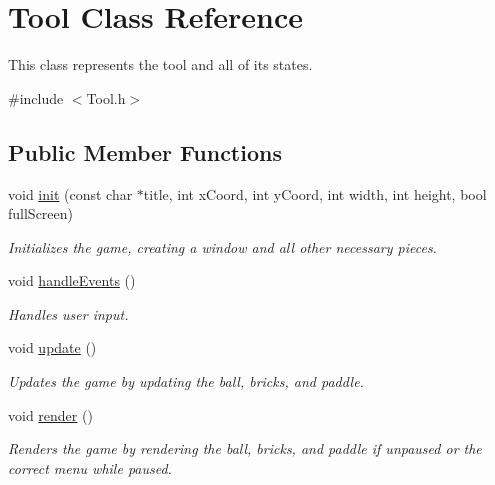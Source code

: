 \hypertarget{class_tool}{}\section{Tool Class Reference}
\label{class_tool}


This class represents the tool and all of its states.  




{\ttfamily \#include $<$Tool.\+h$>$}

\subsection*{Public Member Functions}
\begin{DoxyCompactItemize}
\item 
\mbox{\label{class_tool_a170ddbe1f4b8f32086ff1ce97ccd12c4}} 
void \mbox{\hyperlink{class_tool_a170ddbe1f4b8f32086ff1ce97ccd12c4}{init}} (const char $\ast$title, int x\+Coord, int y\+Coord, int width, int height, bool full\+Screen)
\begin{DoxyCompactList}\small\item\em Initializes the game, creating a window and all other necessary pieces. \end{DoxyCompactList}\item 
void \mbox{\hyperlink{class_tool_ac6f94c15571c1b5cfe05f42d3c1f703a}{handle\+Events}} ()
\begin{DoxyCompactList}\small\item\em Handles user input. \end{DoxyCompactList}\item 
\mbox{\label{class_tool_a6f7159be545ef8c26d9824372a651a34}} 
void \mbox{\hyperlink{class_tool_a6f7159be545ef8c26d9824372a651a34}{update}} ()
\begin{DoxyCompactList}\small\item\em Updates the game by updating the ball, bricks, and paddle. \end{DoxyCompactList}\item 
\mbox{\label{class_tool_a04bf08cc9baa18d59ca96d7e099619a5}} 
void \mbox{\hyperlink{class_tool_a04bf08cc9baa18d59ca96d7e099619a5}{render}} ()
\begin{DoxyCompactList}\small\item\em Renders the game by rendering the ball, bricks, and paddle if unpaused or the correct menu while paused. \end{DoxyCompactList}\item 

\end{DoxyCompactItemize}
